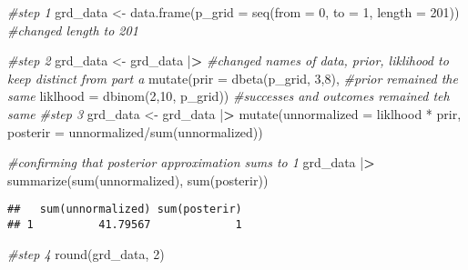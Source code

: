 \documentclass[
]{article}
\newenvironment{Shaded}{\begin{snugshade}}{\end{snugshade}}
\newcommand{\AttributeTok}[1]{\textcolor[rgb]{0.77,0.63,0.00}{#1}}
\newcommand{\CommentTok}[1]{\textcolor[rgb]{0.56,0.35,0.01}{\textit{#1}}}
\newcommand{\DecValTok}[1]{\textcolor[rgb]{0.00,0.00,0.81}{#1}}
\newcommand{\ErrorTok}[1]{\textcolor[rgb]{0.64,0.00,0.00}{\textbf{#1}}}
\newcommand{\FunctionTok}[1]{\textcolor[rgb]{0.00,0.00,0.00}{#1}}
\newcommand{\NormalTok}[1]{#1}
\newcommand{\OtherTok}[1]{\textcolor[rgb]{0.56,0.35,0.01}{#1}}
\newcommand{\SpecialCharTok}[1]{\textcolor[rgb]{0.00,0.00,0.00}{#1}}
\begin{document}
\begin{Shaded}
\begin{Highlighting}[]
\CommentTok{\#step 1}
\NormalTok{grd\_data }\OtherTok{\textless{}{-}} \FunctionTok{data.frame}\NormalTok{(}\AttributeTok{p\_grid =} \FunctionTok{seq}\NormalTok{(}\AttributeTok{from =} \DecValTok{0}\NormalTok{, }\AttributeTok{to =} \DecValTok{1}\NormalTok{, }\AttributeTok{length =} \DecValTok{201}\NormalTok{)) }\CommentTok{\#changed length to 201}

\CommentTok{\#step 2}
\NormalTok{grd\_data }\OtherTok{\textless{}{-}}\NormalTok{ grd\_data }\SpecialCharTok{|}\ErrorTok{\textgreater{}} \CommentTok{\#changed names of data, prior, liklihood to keep distinct from part a }
  \FunctionTok{mutate}\NormalTok{(}\AttributeTok{prir =} \FunctionTok{dbeta}\NormalTok{(p\_grid, }\DecValTok{3}\NormalTok{,}\DecValTok{8}\NormalTok{), }\CommentTok{\#prior remained the same }
         \AttributeTok{liklhood =} \FunctionTok{dbinom}\NormalTok{(}\DecValTok{2}\NormalTok{,}\DecValTok{10}\NormalTok{, p\_grid)) }\CommentTok{\#successes and outcomes remained teh same}
\CommentTok{\#step 3}
\NormalTok{grd\_data }\OtherTok{\textless{}{-}}\NormalTok{ grd\_data }\SpecialCharTok{|}\ErrorTok{\textgreater{}} 
  \FunctionTok{mutate}\NormalTok{(}\AttributeTok{unnormalized =}\NormalTok{ liklhood }\SpecialCharTok{*}\NormalTok{ prir, }
         \AttributeTok{posterir =}\NormalTok{ unnormalized}\SpecialCharTok{/}\FunctionTok{sum}\NormalTok{(unnormalized))}

\CommentTok{\#confirming that posterior approximation sums to 1}
\NormalTok{grd\_data }\SpecialCharTok{|}\ErrorTok{\textgreater{}} \FunctionTok{summarize}\NormalTok{(}\FunctionTok{sum}\NormalTok{(unnormalized), }\FunctionTok{sum}\NormalTok{(posterir))}
\end{Highlighting}
\end{Shaded}

\begin{verbatim}
##   sum(unnormalized) sum(posterir)
## 1          41.79567             1
\end{verbatim}

\begin{Shaded}
\begin{Highlighting}[]
\CommentTok{\#step 4}
\FunctionTok{round}\NormalTok{(grd\_data, }\DecValTok{2}\NormalTok{)}
\end{Highlighting}
\end{Shaded}
\end{document}

